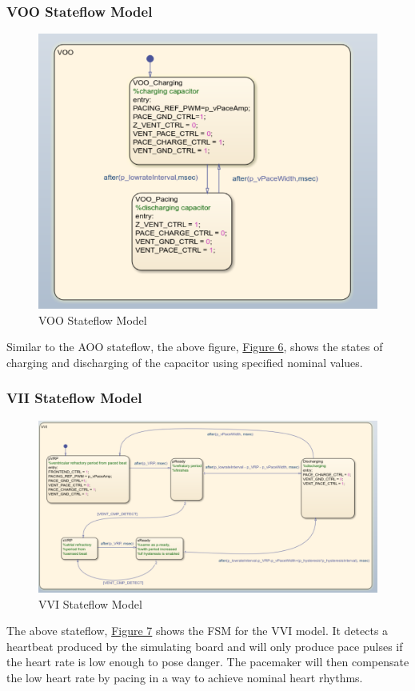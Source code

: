 \documentclass{article}
\begin{document}
\subsubsection{VOO Stateflow Model}
\begin{tcolorbox}
    \begin{figure}[H]
        \includegraphics[width=\textwidth]{VOO.png}
        \caption{VOO Stateflow Model}
        \label{VOOSF}
    \end{figure}
\end{tcolorbox}
Similar to the AOO stateflow, the above figure, \hyperref[VOOSF]{Figure 6}, shows the states of 
charging and discharging of the capacitor using specified nominal values. 

\newpage
\subsubsection{VII Stateflow Model}
\begin{tcolorbox}
    \begin{figure}[H]
        \includegraphics[width=\textwidth]{VVI.png}
        \caption{VVI Stateflow Model}
        \label{VVISF}
    \end{figure}
\end{tcolorbox}
The above stateflow, \hyperref[VVISF]{Figure 7} shows the FSM for the VVI model. It detects a heartbeat produced by the simulating board 
and will only produce pace pulses if the heart rate is low enough to pose danger. The pacemaker will then compensate the low heart rate 
by pacing in a way to achieve nominal heart rhythms.  
\end{document}
